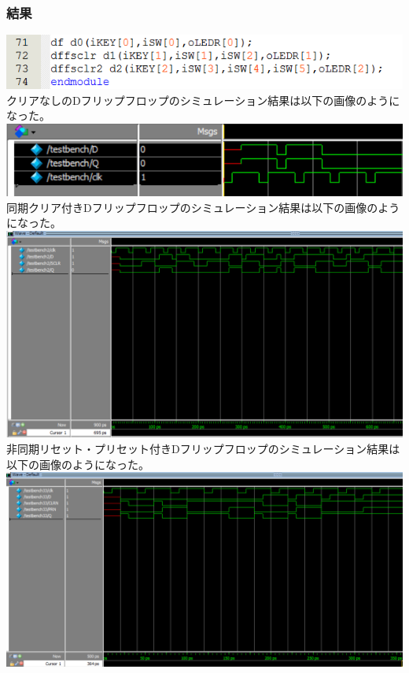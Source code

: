 \documentclass[a4paper]{jarticle}
\begin{document}
\subsubsection{結果}
\includegraphics[width=15cm]{work13/13-1.PNG}\\
クリアなしのDフリップフロップのシミュレーション結果は以下の画像のようになった。\\
\includegraphics[width=15cm]{work13/13-m-1.PNG}\\
同期クリア付きDフリップフロップのシミュレーション結果は以下の画像のようになった。\\
\includegraphics[width=15cm]{work13/13-m-2.PNG}\\
非同期リセット・プリセット付きDフリップフロップのシミュレーション結果は以下の画像のようになった。\\
\includegraphics[width=15cm]{work13/13-m-3.PNG}\\
\end{document}
